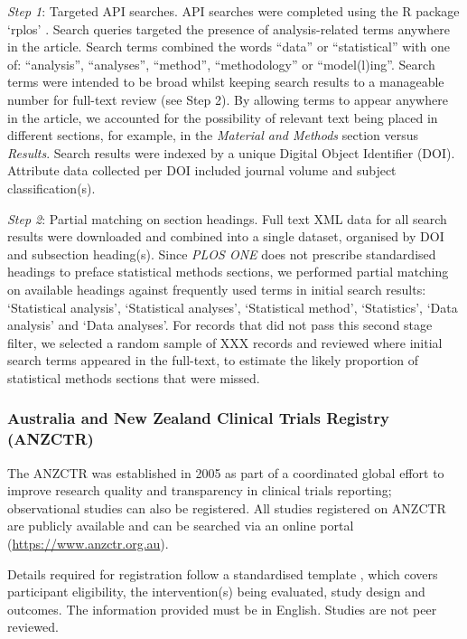 \documentclass[12pt]{article}
\begin{document}
\emph{Step 1}: Targeted API searches. API searches were completed using
the R package `rplos' \citep{rplos}. Search queries targeted the
presence of analysis-related terms anywhere in the article. Search terms
combined the words ``data'' or ``statistical'' with one of:
``analysis'', ``analyses'', ``method'', ``methodology'' or
``model(l)ing''. Search terms were intended to be broad whilst keeping
search results to a manageable number for full-text review (see Step 2).
By allowing terms to appear anywhere in the article, we accounted for
the possibility of relevant text being placed in different sections, for
example, in the \emph{Material and Methods} section versus
\emph{Results}. Search results were indexed by a unique Digital Object
Identifier (DOI). Attribute data collected per DOI included journal
volume and subject classification(s).

\emph{Step 2}: Partial matching on section headings. Full text XML data
for all search results were downloaded and combined into a single
dataset, organised by DOI and subsection heading(s). Since \emph{PLOS
ONE} does not prescribe standardised headings to preface statistical
methods sections, we performed partial matching on available headings
against frequently used terms in initial search results: `Statistical
analysis', `Statistical analyses', `Statistical method', `Statistics',
`Data analysis' and `Data analyses'. For records that did not pass this
second stage filter, we selected a random sample of XXX records and
reviewed where initial search terms appeared in the full-text, to
estimate the likely proportion of statistical methods sections that were
missed.

\subsubsection{Australia and New Zealand Clinical Trials Registry (ANZCTR)}
\label{sec:methodsANZCTR}

The ANZCTR was established in 2005 as part of a coordinated global
effort to improve research quality and transparency in clinical trials
reporting; observational studies can also be registered. All studies
registered on ANZCTR are publicly available and can be searched via an
online portal (\url{https://www.anzctr.org.au}).

Details required for registration follow a standardised template
\citep{ANZCTR}, which covers participant eligibility, the
intervention(s) being evaluated, study design and outcomes. The
information provided must be in English. Studies are not peer reviewed.
\end{document}
